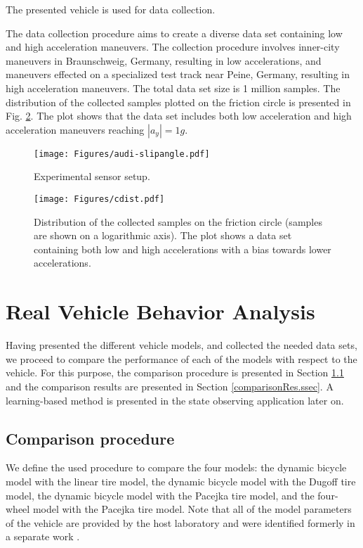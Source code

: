 \documentclass[journal]{IEEEtran}
\begin{document}
The presented vehicle is used for data collection. 

The data collection procedure aims to create a diverse data set containing low and high acceleration maneuvers. The collection procedure involves inner-city maneuvers in Braunschweig, Germany, resulting in low accelerations, and maneuvers effected on a specialized test track near Peine, Germany, resulting in high acceleration maneuvers. The total data set size is 1 million samples. The distribution of the collected samples plotted on the friction circle is presented in Fig. \ref{frictionCircle.fig}. The plot shows that the data set includes both low acceleration and high acceleration maneuvers reaching $|a_y|=1g$. 


\begin{figure}[h]
    \centering
    \texttt{[image: Figures/audi-slipangle.pdf]}
    \caption{Experimental sensor setup.}
    \label{sensorSetup.fig}
\end{figure}
\begin{figure}[h]
    \centering
    \texttt{[image: Figures/cdist.pdf]}
    \caption{Distribution of the collected samples on the friction circle (samples are shown on a logarithmic axis). The plot shows a data set containing both low and high accelerations with a bias towards lower accelerations.}
    \label{frictionCircle.fig}
\end{figure}

\section{Real Vehicle Behavior Analysis}\label{realAnalysis.sec}
Having presented the different vehicle models, and collected the needed data sets, we proceed to compare the performance of each of the models with respect to the vehicle. For this purpose, the comparison procedure is presented in Section \ref{comparisonAlg.ssec} and the comparison results are presented in Section \ref{comparisonRes.ssec}. A learning-based method is presented in the state observing application later on.

\subsection{Comparison procedure}\label{comparisonAlg.ssec}
We define the used procedure to compare the four models: the dynamic bicycle model with the linear tire model, the dynamic bicycle model with the Dugoff tire model, the dynamic bicycle model with the Pacejka tire model, and the four-wheel model with the Pacejka tire model. Note that all of the model parameters of the vehicle are provided by the host laboratory and were identified formerly in a separate work \mbox{\cite{wille_stadtpilot_2010}}.   
\end{document}
